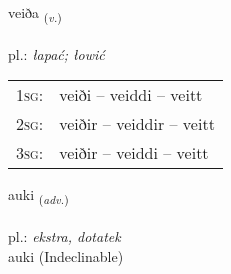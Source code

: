 \documentclass[frontgrid, backgrid]{flacards}\usepackage[]{graphicx}\usepackage[]{xcolor}
\begin{document}
\renewcommand{\flhead}{\vskip5pt \fboxsep=0pt {\small\bfseries\footnotesize Sagnorð | Verb}}
\renewcommand{\fcfoot}{\vskip5pt \fboxsep=0pt \hspace{2pt}{\small\bfseries\footnotesize 2K}}

\renewcommand{\blhead}{\vskip5pt {\small\bfseries\footnotesize Sagnorð | Verb }}
\renewcommand{\bcfoot}{\vskip5pt \hspace{2pt}{\small\bfseries\footnotesize 2K}}


{veiða \small{\textsubscript{(\textit{v.})}} \\[1ex] %
\textphonetic{[veiːða]} \\
pl.: \emph{łapać; łowić} \\  [2ex]
\renewcommand*{\arraystretch}{0.8}
\begin{tabular}{p{1cm}l}
\textsc{1sg}: & veiði -- veiddi -- veitt \\ 
\textsc{2sg}: & veiðir -- veiddir -- veitt \\ 
\textsc{3sg}: & veiðir -- veiddi -- veitt \\ 
\end{tabular}
}


\renewcommand{\flhead}{\vskip5pt \fboxsep=0pt {\small\bfseries\footnotesize Atviksorð | Adverb}}
\renewcommand{\fcfoot}{\vskip5pt \fboxsep=0pt \hspace{2pt}{\small\bfseries\footnotesize 2K}}

\renewcommand{\blhead}{\vskip5pt {\small\bfseries\footnotesize Atviksorð | Adverb }}
\renewcommand{\bcfoot}{\vskip5pt \hspace{2pt}{\small\bfseries\footnotesize 2K}}


{auki \small{\textsubscript{(\textit{adv.})}} \\[1ex]
\textphonetic{[œiːcɪ]} \\
pl.: \emph{ekstra, dotatek} \\  [2ex]
auki (Indeclinable)}

\renewcommand{\flhead}{\vskip5pt \fboxsep=0pt {\small\bfseries\footnotesize Lýsingarorð | Adjective}}
\renewcommand{\fcfoot}{\vskip5pt \fboxsep=0pt \hspace{2pt}{\small\bfseries\footnotesize 2K}}
\end{document}
